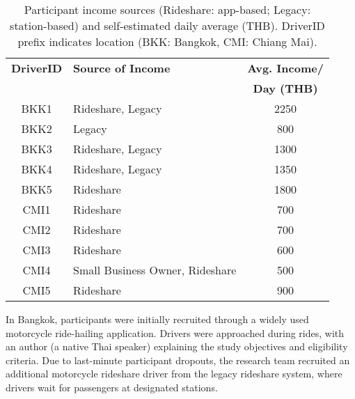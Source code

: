 \begin{table}[ht]
    \centering
    \caption[Participant Income]{Participant income sources (Rideshare: app-based; Legacy: station-based) and self-estimated daily average (THB).
    DriverID prefix indicates location (BKK: Bangkok, CMI: Chiang Mai).}
    \begin{tabular}{|c|l|c|}
        \hline
        \textbf{DriverID} & \textbf{Source of Income} & \textbf{Avg. Income/} \\
         &  & \textbf{Day (THB)} \\
        \hline
        BKK1  & Rideshare, Legacy & 2250 \\
        BKK2  & Legacy & 800 \\
        BKK3  & Rideshare, Legacy & 1300 \\
        BKK4  & Rideshare, Legacy & 1350 \\
        BKK5  & Rideshare & 1800 \\
        CMI1  & Rideshare & 700 \\
        CMI2  & Rideshare & 700 \\
        CMI3  & Rideshare & 600 \\
        CMI4  & Small Business Owner, Rideshare & 500 \\
        CMI5  & Rideshare & 900 \\
        \hline
    \end{tabular}
    \label{tab:demo}
\end{table}

In Bangkok, participants were initially recruited through a widely used motorcycle ride-hailing application. 
Drivers were approached during rides, with an author (a native Thai speaker) explaining the study objectives and eligibility criteria. 
Due to last-minute participant dropouts, the research team recruited an additional motorcycle rideshare driver from the legacy rideshare system, where drivers wait for passengers at designated stations. 


